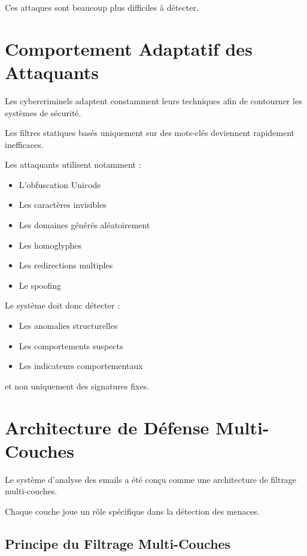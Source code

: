 \documentclass[12pt,a4paper]{article}
\begin{document}
Ces attaques sont beaucoup plus difficiles à détecter.

\section{Comportement Adaptatif des Attaquants}

Les cybercriminels adaptent constamment leurs techniques afin de contourner les systèmes de sécurité.

Les filtres statiques basés uniquement sur des mots-clés deviennent rapidement inefficaces.

Les attaquants utilisent notamment :
\begin{itemize}
    \item L'obfuscation Unicode
    \item Les caractères invisibles
    \item Les domaines générés aléatoirement
    \item Les homoglyphes
    \item Les redirections multiples
    \item Le spoofing
\end{itemize}

Le système doit donc détecter :
\begin{itemize}
    \item Les anomalies structurelles
    \item Les comportements suspects
    \item Les indicateurs comportementaux
\end{itemize}

et non uniquement des signatures fixes.

\section{Architecture de Défense Multi-Couches}

Le système d'analyse des emails a été conçu comme une architecture de filtrage multi-couches.

Chaque couche joue un rôle spécifique dans la détection des menaces.

\subsection{Principe du Filtrage Multi-Couches}
\end{document}
